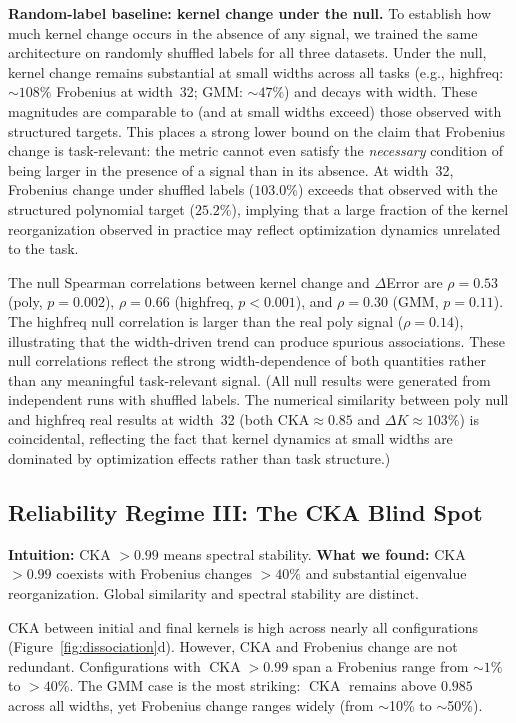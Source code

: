 \documentclass[twoside,11pt]{article}
\newcommand{\cca}{{\operatorname{CKA}}}
\begin{document}
\textbf{Random-label baseline: kernel change under the null.}  To establish how much kernel change occurs in the absence of any signal, we trained the same architecture on randomly shuffled labels for all three datasets.  Under the null, kernel change remains substantial at small widths across all tasks (e.g., highfreq: $\sim\!108\%$ Frobenius at width~32; GMM: $\sim\!47\%$) and decays with width.  These magnitudes are comparable to (and at small widths exceed) those observed with structured targets. This places a strong lower bound on the claim that Frobenius change is task-relevant: the metric cannot even satisfy the \emph{necessary} condition of being larger in the presence of a signal than in its absence.  At width~32, Frobenius change under shuffled labels ($103.0\%$) exceeds that observed with the structured polynomial target ($25.2\%$), implying that a large fraction of the kernel reorganization observed in practice may reflect optimization dynamics unrelated to the task.

The null Spearman correlations between kernel change and $\Delta$Error are $\rho=0.53$ (poly, $p=0.002$), $\rho=0.66$ (highfreq, $p<0.001$), and $\rho=0.30$ (GMM, $p=0.11$).  The highfreq null correlation is larger than the real poly signal ($\rho=0.14$), illustrating that the width-driven trend can produce spurious associations.  These null correlations reflect the strong width-dependence of both quantities rather than any meaningful task-relevant signal. (All null results were generated from independent runs with shuffled labels. The numerical similarity between poly null and highfreq real results at width~32 (both $\text{CKA}\approx0.85$ and $\Delta K\approx103\%$) is coincidental, reflecting the fact that kernel dynamics at small widths are dominated by optimization effects rather than task structure.)

\subsection{Reliability Regime III: The CKA Blind Spot}
\label{sec:cka}

\noindent\textbf{Intuition:} CKA $>0.99$ means spectral stability. \textbf{What we found:} CKA $>0.99$ coexists with Frobenius changes $>40\%$ and substantial eigenvalue reorganization. Global similarity and spectral stability are distinct.

CKA between initial and final kernels is high across nearly all configurations (Figure~\ref{fig:dissociation}d).  However, CKA and Frobenius change are not redundant.  Configurations with $\cca>0.99$ span a Frobenius range from $\sim1\%$ to $>40\%$.  The GMM case is the most striking: $\cca$ remains above $0.985$ across all widths, yet Frobenius change ranges widely (from $\sim$10\% to $\sim$50\%).
\end{document}
